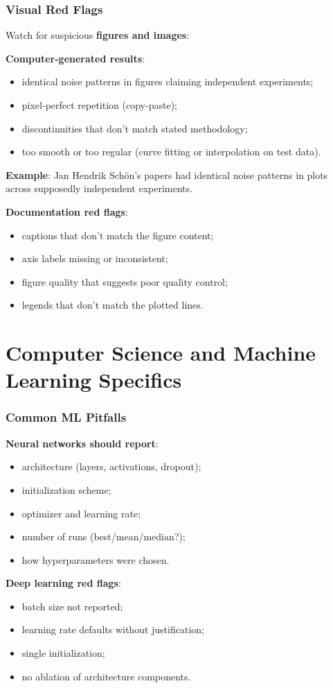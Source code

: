 \documentclass[]{beamer}
\begin{document}
\begin{frame}[fragile]
\frametitle{Visual Red Flags}
Watch for suspicious \textbf{figures and images}:

\textbf{Computer-generated results}:
\begin{itemize}
  \item identical noise patterns in figures claiming independent experiments;
  \item pixel-perfect repetition (copy-paste);
  \item discontinuities that don't match stated methodology;
  \item too smooth or too regular (curve fitting or interpolation on test data).
\end{itemize}

\textbf{Example}: Jan Hendrik Schön's papers had identical noise patterns in plots across supposedly independent experiments.

\textbf{Documentation red flags}:
\begin{itemize}
  \item captions that don't match the figure content;
  \item axis labels missing or inconsistent;
  \item figure quality that suggests poor quality control;
  \item legends that don't match the plotted lines.
\end{itemize}

\end{frame}

\section{Computer Science and Machine Learning Specifics}

\begin{frame}[fragile]
\frametitle{Common ML Pitfalls}
\textbf{Neural networks should report}:
\begin{itemize}
  \item architecture (layers, activations, dropout);
  \item initialization scheme;
  \item optimizer and learning rate;
  \item number of runs (best/mean/median?);
  \item how hyperparameters were chosen.
\end{itemize}

\textbf{Deep learning red flags}:
\begin{itemize}
  \item batch size not reported;
  \item learning rate defaults without justification;
  \item single initialization;
  \item no ablation of architecture components.
\end{itemize}

\end{frame}
\end{document}

